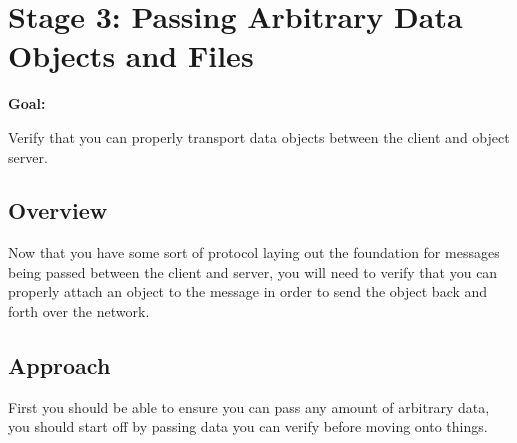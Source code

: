 \documentclass{article}
\begin{document}

\newpage
\section{Stage 3: Passing Arbitrary Data Objects and Files} %

\begin{large}\textbf{Goal:}\end{large} Verify that you can properly transport data objects between the client and object server. 


\subsection*{Overview}
Now that you have some sort of protocol laying out the foundation for messages being passed between the client and server, you will need to verify that you can properly attach an object to the message in order to send the object back and forth over the network. 

\subsection*{Approach}
First you should be able to ensure you can pass any amount of arbitrary data, you should start off by passing data you can verify before moving onto things. 
\end{document}
